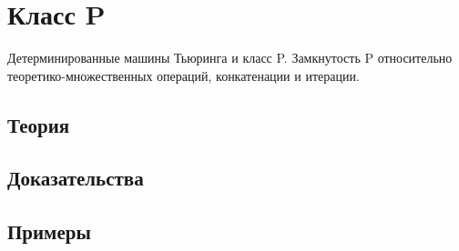 
\section{Класс P}
\label{sec:2.3a.10-class-p}

\begin{ticket}
Детерминированные машины Тьюринга и класс P. Замкнутость P относительно теоретико-множественных операций, конкатенации и итерации.
\end{ticket}

\subsection*{Теория}

\subsection*{Доказательства}

\subsection*{Примеры}
